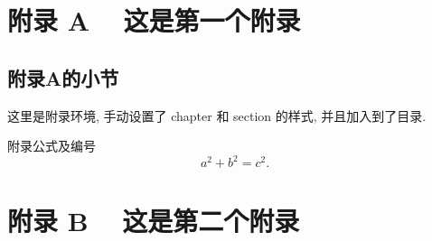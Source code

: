 \documentclass[master]{shnuthesis}
\begin{document}

%
%
%
%
%
%





\appendix

\chapter{附录 A ~ 这是第一个附录}
\renewcommand{\thesection}{A.\arabic{section}} %
\renewcommand{\theequation}{A.\arabic{equation}} %
\renewcommand{\thefigure}{A.\arabic{figure}} %
\setcounter{table}{0}
\renewcommand{\thetable}{A.\arabic{table}} %

\section{附录A的小节}

这里是附录环境, 手动设置了 chapter 和 section 的样式, 并且加入到了目录.

附录公式及编号
\begin{equation}\label{eq:abc}
  a^2+b^2=c^2.
\end{equation}


\chapter{附录 B ~ 这是第二个附录}
\renewcommand{\thesection}{B.\arabic{section}}
\renewcommand{\theequation}{B.\arabic{equation}}
\renewcommand{\thefigure}{B.\arabic{figure}}
\setcounter{table}{0}
\renewcommand{\thetable}{B.\arabic{table}}
\end{document}
